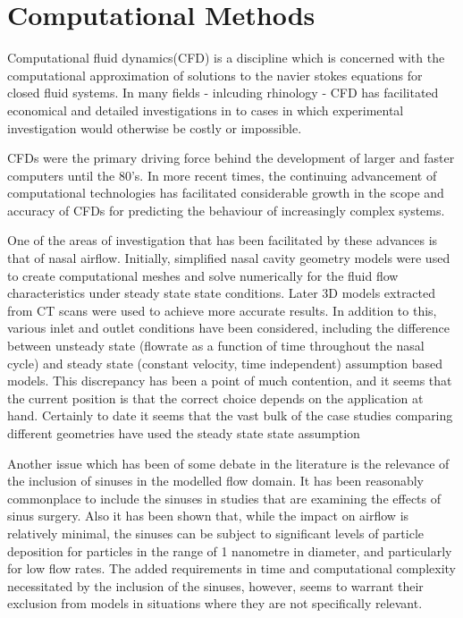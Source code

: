 \section{Computational Methods}  
Computational fluid dynamics(CFD) is a discipline which is concerned with the computational approximation of solutions to the navier stokes equations for closed fluid systems\cite{Tu2008}. In many fields - inlcuding rhinology - CFD has facilitated economical and detailed investigations in to cases in which experimental investigation would otherwise be costly or impossible\cite{Keyhani1995}.

CFDs were the primary driving force behind the development of larger and faster computers until the 80's\cite{Wendt2009}. In more recent times, the continuing advancement of computational technologies has facilitated considerable growth in the scope and accuracy of CFDs for predicting the behaviour of increasingly complex systems\cite{Tu2008}. 

One of the areas of investigation that has been facilitated by these advances is that of nasal airflow. Initially, simplified nasal cavity geometry models were used to create computational meshes and solve numerically for the fluid flow characteristics under steady state state conditions\cite{Keyhani1995, Hahn1993}. Later 3D models extracted from CT scans were used to achieve more accurate results\cite{Martonen2002}. In addition to this, various inlet and outlet conditions have been considered, including the difference between unsteady state  (flowrate as a function of time throughout the nasal cycle)\cite{Shi2006} and steady state (constant velocity, time independent) assumption based models\cite{Wen2008}. This discrepancy has been a point of much contention, and it seems that the current position is that the correct choice depends on the application at hand\cite{Doorly2008c}. Certainly to date it seems that the vast bulk of the case studies comparing different geometries have used the steady state state assumption\cite{Xi2012, Zhu2011, Garcia2007}

Another issue which has been of some debate in the literature is the relevance of the inclusion of sinuses in the modelled flow domain. It has been reasonably commonplace to include the sinuses in studies that are examining the effects of sinus surgery\cite{Xiong2008a, Lindemann2005}. Also it has been shown that, while the impact on airflow is relatively minimal, the sinuses can be subject to significant levels of particle deposition for particles in the range of 1 nanometre in diameter, and particularly for low flow rates\cite{Ge2012}. The added requirements in time and computational complexity necessitated by the inclusion of the sinuses, however, seems to warrant their exclusion from models in situations where they are not specifically relevant\cite{Doorly2008c}.

